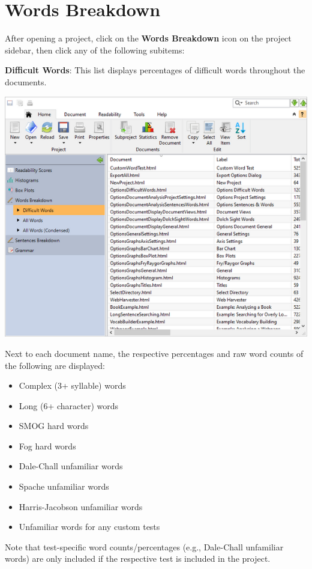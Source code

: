 \documentclass[
]{book}
\providecommand{\tightlist}{%
  \setlength{\itemsep}{0pt}\setlength{\parskip}{0pt}}
\theoremstyle{definition}
\theoremstyle{definition}
\theoremstyle{definition}
\theoremstyle{definition}
\theoremstyle{remark}
\begin{document}
\hypertarget{reviewing-batch-words}{%
\section{Words Breakdown}\label{reviewing-batch-words}}

After opening a project, click on the \textbf{Words Breakdown} icon on the project sidebar, then click any of the following subitems:

\textbf{Difficult Words}: This list displays percentages of difficult words throughout the documents.

\includegraphics{Images/batchdifficultwords.png}

Next to each document name, the respective percentages and raw word counts of the following are displayed:

\begin{itemize}
\tightlist
\item
  Complex (3+ syllable) words
\item
  Long (6+ character) words
\item
  SMOG hard words
\item
  Fog hard words
\item
  Dale-Chall unfamiliar words
\item
  Spache unfamiliar words
\item
  Harris-Jacobson unfamiliar words
\item
  Unfamiliar words for any custom tests
\end{itemize}

Note that test-specific word counts/percentages (e.g., Dale-Chall unfamiliar words) are only included if the respective test is included in the project.
\end{document}
